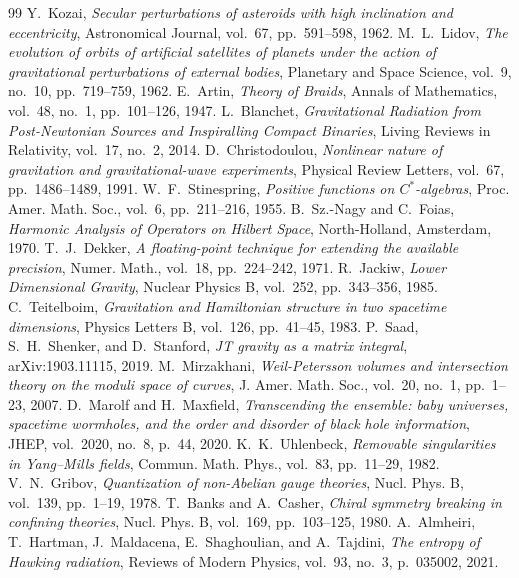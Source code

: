 \documentclass[11pt,a4paper,reqno]{article}
\theoremstyle{plain}
\theoremstyle{definition}
\theoremstyle{remark}
\numberwithin{equation}{section}
\numberwithin{table}{section}
\begin{document}
\begin{thebibliography}{99}
 Y.~Kozai, \emph{Secular perturbations of asteroids with high inclination and eccentricity}, Astronomical Journal, vol.~67, pp.~591--598, 1962.
 M.~L.~Lidov, \emph{The evolution of orbits of artificial satellites of planets under the action of gravitational perturbations of external bodies}, Planetary and Space Science, vol.~9, no.~10, pp.~719--759, 1962.
 E.~Artin, \emph{Theory of Braids}, Annals of Mathematics, vol.~48, no.~1, pp.~101--126, 1947.
 L.~Blanchet, \emph{Gravitational Radiation from Post-Newtonian Sources and Inspiralling Compact Binaries}, Living Reviews in Relativity, vol.~17, no.~2, 2014.
 D.~Christodoulou, \emph{Nonlinear nature of gravitation and gravitational-wave experiments}, Physical Review Letters, vol.~67, pp.~1486--1489, 1991.
 W.~F.~Stinespring, \emph{Positive functions on $C^*$-algebras}, Proc. Amer. Math. Soc., vol.~6, pp.~211--216, 1955.
 B.~Sz.-Nagy and C.~Foias, \emph{Harmonic Analysis of Operators on Hilbert Space}, North-Holland, Amsterdam, 1970.
 T.~J.~Dekker, \emph{A floating-point technique for extending the available precision}, Numer. Math., vol.~18, pp.~224--242, 1971.
 R.~Jackiw, \emph{Lower Dimensional Gravity}, Nuclear Physics B, vol.~252, pp.~343--356, 1985.
 C.~Teitelboim, \emph{Gravitation and Hamiltonian structure in two spacetime dimensions}, Physics Letters B, vol.~126, pp.~41--45, 1983.
 P.~Saad, S.~H.~Shenker, and D.~Stanford, \emph{JT gravity as a matrix integral}, arXiv:1903.11115, 2019.
 M.~Mirzakhani, \emph{Weil-Petersson volumes and intersection theory on the moduli space of curves}, J. Amer. Math. Soc., vol.~20, no.~1, pp.~1--23, 2007.
 D.~Marolf and H.~Maxfield, \emph{Transcending the ensemble: baby universes, spacetime wormholes, and the order and disorder of black hole information}, JHEP, vol.~2020, no.~8, p.~44, 2020.
 K.~K.~Uhlenbeck, \emph{Removable singularities in Yang--Mills fields}, Commun. Math. Phys., vol.~83, pp.~11--29, 1982.
 V.~N.~Gribov, \emph{Quantization of non-Abelian gauge theories}, Nucl. Phys. B, vol.~139, pp.~1--19, 1978.
 T.~Banks and A.~Casher, \emph{Chiral symmetry breaking in confining theories}, Nucl. Phys. B, vol.~169, pp.~103--125, 1980.
 A.~Almheiri, T.~Hartman, J.~Maldacena, E.~Shaghoulian, and A.~Tajdini, \emph{The entropy of Hawking radiation}, Reviews of Modern Physics, vol.~93, no.~3, p.~035002, 2021.

\end{thebibliography}
\end{document}

